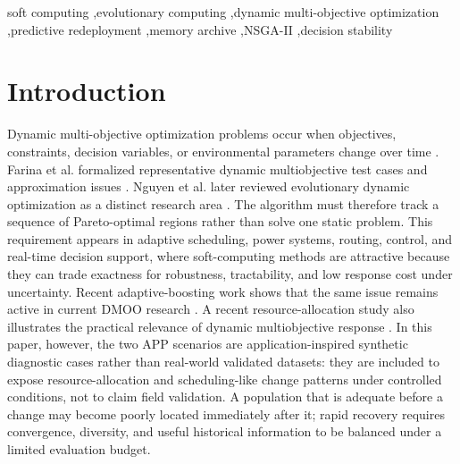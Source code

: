 \documentclass[1p,times]{elsarticle}
\begin{document}
\begin{frontmatter}
\begin{abstract}
as a simpler, interpretable, and selection-safe soft-computing alternative for rapid recovery when prediction reliability varies across environments.
\end{abstract}



\begin{keyword}
soft computing \sep evolutionary computing \sep dynamic multi-objective optimization \sep predictive redeployment \sep memory archive \sep NSGA-II \sep decision stability
\end{keyword}

\end{frontmatter}

\section{Introduction}
Dynamic multi-objective optimization problems occur when objectives, constraints, decision variables, or environmental parameters change over time \cite{branke2002}. Farina et al. formalized representative dynamic multiobjective test cases and approximation issues \cite{farina2004}. Nguyen et al. later reviewed evolutionary dynamic optimization as a distinct research area \cite{nguyen2012}. The algorithm must therefore track a sequence of Pareto-optimal regions rather than solve one static problem. This requirement appears in adaptive scheduling, power systems, routing, control, and real-time decision support, where soft-computing methods are attractive because they can trade exactness for robustness, tractability, and low response cost under uncertainty. Recent adaptive-boosting work shows that the same issue remains active in current DMOO research \cite{peng2024ab}. A recent resource-allocation study also illustrates the practical relevance of dynamic multiobjective response \cite{hu2025resource}. In this paper, however, the two APP scenarios are application-inspired synthetic diagnostic cases rather than real-world validated datasets: they are included to expose resource-allocation and scheduling-like change patterns under controlled conditions, not to claim field validation. A population that is adequate before a change may become poorly located immediately after it; rapid recovery requires convergence, diversity, and useful historical information to be balanced under a limited evaluation budget.
\end{document}

